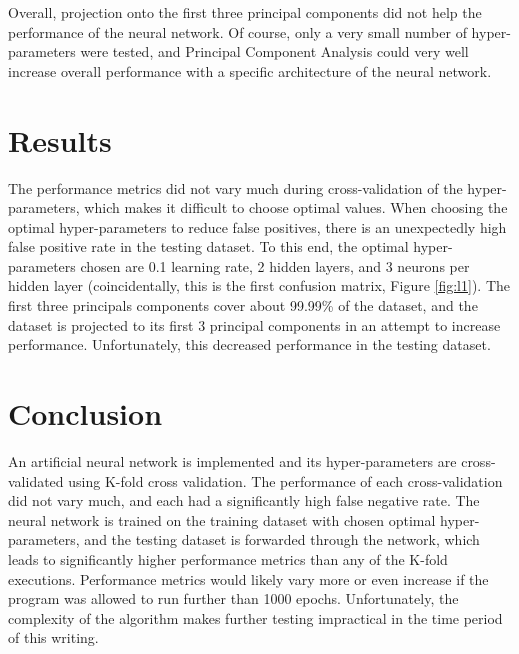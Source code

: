 \documentclass[tikz]{article}
\begin{document}
Overall, projection onto the first three principal components did not help the performance of the neural network. Of course, only a very small number of hyper-parameters were tested, and Principal Component Analysis could very well increase overall performance with a specific architecture of the neural network. 

\section{Results}
\label{sec:results}

The performance metrics did not vary much during cross-validation of the hyper-parameters, which makes it difficult to choose optimal values. When choosing the optimal hyper-parameters to reduce false positives, there is an unexpectedly high false positive rate in the testing dataset. To this end, the optimal hyper-parameters chosen are 0.1 learning rate, 2 hidden layers, and 3 neurons per hidden layer (coincidentally, this is the first confusion matrix, Figure \ref{fig:l1}). The first three principals components cover about 99.99\% of the dataset, and the dataset is projected to its first 3 principal components in an attempt to increase performance. Unfortunately, this decreased performance in the testing dataset.

\section{Conclusion}
\label{sec:conclusion}
An artificial neural network is implemented and its hyper-parameters are cross-validated using K-fold cross validation. The performance of each cross-validation did not vary much, and each had a significantly high false negative rate. The neural network is trained on the training dataset with chosen optimal hyper-parameters, and the testing dataset is forwarded through the network, which leads to significantly higher performance metrics than any of the K-fold executions. Performance metrics would likely vary more or even increase if the program was allowed to run further than 1000 epochs. Unfortunately, the complexity of the algorithm makes further testing impractical in the time period of this writing. 
\end{document}
